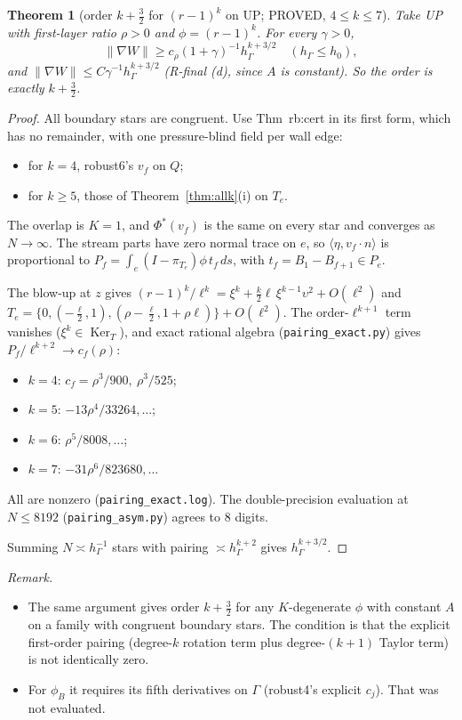\documentclass[11pt]{article}
\newtheorem{theorem}{Theorem}[section]
\theoremstyle{remark}
\newcommand{\hG}{h_\Gamma}
\newcommand{\ip}[2]{\langle #1,#2\rangle}
\begin{document}
\begin{theorem}[order $k+\frac32$ for $(r-1)^k$ on \textsf{UP}; PROVED, $4\le k\le7$]\label{thm:k32}
Take \textsf{UP} with first-layer ratio $\rho>0$ and $\phi=(r-1)^k$. For every $\gamma>0$,
\[
\|\nabla W\|\ge c_\rho(1+\gamma)^{-1}\hG^{k+3/2}\quad(\hG\le h_0),
\]
and $\|\nabla W\|\le C\gamma^{-1}\hG^{k+3/2}$ (R-final (d), since $A$ is constant). So the order is exactly $k+\frac32$.
\end{theorem}
\begin{proof}
All boundary stars are congruent. Use Thm~rb:cert in its first form, which has no remainder, with one pressure-blind field per wall edge:
\begin{itemize}
\item for $k=4$, robust6's $v_f$ on $Q$;
\item for $k\ge5$, those of Theorem~\ref{thm:allk}(i) on $T_e$.
\end{itemize}
The overlap is $K=1$, and $\Phi^\ast(v_f)$ is the same on every star and converges as $N\to\infty$. The stream parts have zero normal trace on $e$, so
$\ip\eta{v_f\cdot n}$ is proportional to $P_f=\int_e(I-\pi_{T_e})\phi\,t_f\,ds$, with $t_f=B_1-B_{f+1}\in P_e$.

The blow-up at $z$ gives $(r-1)^k/\ell^k=\xi^k+\frac k2\ell\,\xi^{k-1}\upsilon^2+O(\ell^2)$ and
$T_e=\{0,(-\frac\ell2,1),(\rho-\frac\ell2,1+\rho\ell)\}+O(\ell^2)$. The order-$\ell^{k+1}$ term vanishes ($\xi^k\in\operatorname{Ker}_T$), and exact
rational algebra (\texttt{pairing\_exact.py}) gives $P_f/\ell^{k+2}\to c_f(\rho)$:
\begin{itemize}
\item $k=4$: $c_f=\rho^3/900,\ \rho^3/525$;
\item $k=5$: $-13\rho^4/33264,\dots$;
\item $k=6$: $\rho^5/8008,\dots$;
\item $k=7$: $-31\rho^6/823680,\dots$
\end{itemize}
All are nonzero (\texttt{pairing\_exact.log}). The double-precision evaluation at $N\le8192$ (\texttt{pairing\_asym.py}) agrees to 8 digits.

Summing $N\asymp\hG^{-1}$ stars with pairing $\asymp\hG^{k+2}$ gives $\hG^{k+3/2}$.
\end{proof}

\noindent\emph{Remark.}
\begin{itemize}
\item The same argument gives order $k+\frac32$ for any $K$-degenerate $\phi$ with constant $A$ on a family with congruent boundary stars. The condition is that the explicit
first-order pairing (degree-$k$ rotation term plus degree-$(k+1)$ Taylor term) is not identically zero.
\item For $\phi_B$ it requires its fifth derivatives on $\Gamma$ (robust4's
explicit $c_j$). That was not evaluated.
\end{itemize}
\end{document}
